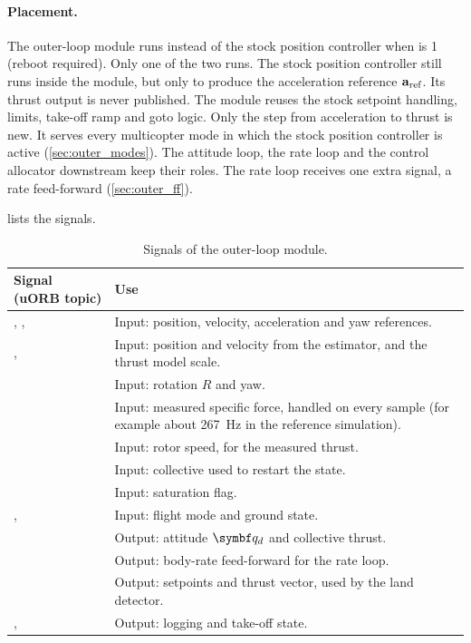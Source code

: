 \paragraph{Placement.}
The outer-loop module runs instead of the stock position controller when  is 1 (reboot required).
Only one of the two runs.
The stock position controller still runs inside the module, but only to produce the acceleration reference $\mathbf{a}_{\mathrm{ref}}$.
Its thrust output is never published.
The module reuses the stock setpoint handling, limits, take-off ramp and goto logic.
Only the step from acceleration to thrust is new.
It serves every multicopter mode in which the stock position controller is active (\cref{sec:outer_modes}).
The attitude loop, the rate loop and the control allocator downstream keep their roles.
The rate loop receives one extra signal, a rate feed-forward (\cref{sec:outer_ff}).

 lists the signals.

\begin{table}[tbp]
\caption{Signals of the outer-loop module.}\label{tab:outer_io}
\centering
\small
\begin{tabularx}{\textwidth}{@{}L{4.4cm} Y@{}}
\toprule
Signal (uORB topic) & Use \\
\midrule
{}, ,  & Input: position, velocity, acceleration and yaw references. \\
,  & Input: position and velocity from the estimator, and the thrust model scale. \\
 & Input: rotation $R$ and yaw. \\
 & Input: measured specific force, handled on every sample (for example about 267~Hz in the reference simulation). \\
 & Input: rotor speed, for the measured thrust. \\
 & Input: collective used to restart the state. \\
 & Input: saturation flag. \\
,  & Input: flight mode and ground state. \\
 & Output: attitude $\vect q_d$ and collective thrust. \\
 & Output: body-rate feed-forward for the rate loop. \\
 & Output: setpoints and thrust vector, used by the land detector. \\
,  & Output: logging and take-off state. \\
\bottomrule
\end{tabularx}
\end{table}

